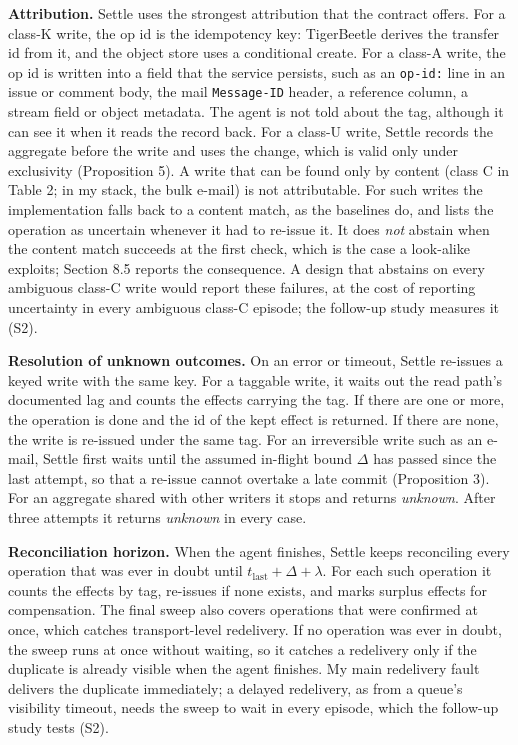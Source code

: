 \documentclass[
  10pt,
]{article}
\begin{document}
\textbf{Attribution.} Settle uses the strongest attribution that the
contract offers. For a class-K write, the op id is the idempotency key:
TigerBeetle derives the transfer id from it, and the object store uses a
conditional create. For a class-A write, the op id is written into a
field that the service persists, such as an \texttt{op-id:} line in an
issue or comment body, the mail \texttt{Message-ID} header, a reference
column, a stream field or object metadata. The agent is not told about
the tag, although it can see it when it reads the record back. For a
class-U write, Settle records the aggregate before the write and uses
the change, which is valid only under exclusivity (Proposition 5). A
write that can be found only by content (class C in Table 2; in my
stack, the bulk e-mail) is not attributable. For such writes the
implementation falls back to a content match, as the baselines do, and
lists the operation as uncertain whenever it had to re-issue it. It does
\emph{not} abstain when the content match succeeds at the first check,
which is the case a look-alike exploits; Section 8.5 reports the
consequence. A design that abstains on every ambiguous class-C write
would report these failures, at the cost of reporting uncertainty in
every ambiguous class-C episode; the follow-up study measures it (S2).

\textbf{Resolution of unknown outcomes.} On an error or timeout, Settle
re-issues a keyed write with the same key. For a taggable write, it
waits out the read path's documented lag and counts the effects carrying
the tag. If there are one or more, the operation is done and the id of
the kept effect is returned. If there are none, the write is re-issued
under the same tag. For an irreversible write such as an e-mail, Settle
first waits until the assumed in-flight bound \(\Delta\) has passed
since the last attempt, so that a re-issue cannot overtake a late commit
(Proposition 3). For an aggregate shared with other writers it stops and
returns \emph{unknown}. After three attempts it returns \emph{unknown}
in every case.

\textbf{Reconciliation horizon.} When the agent finishes, Settle keeps
reconciling every operation that was ever in doubt until
\(t_{\text{last}} + \Delta + \lambda\). For each such operation it
counts the effects by tag, re-issues if none exists, and marks surplus
effects for compensation. The final sweep also covers operations that
were confirmed at once, which catches transport-level redelivery. If no
operation was ever in doubt, the sweep runs at once without waiting, so
it catches a redelivery only if the duplicate is already visible when
the agent finishes. My main redelivery fault delivers the duplicate
immediately; a delayed redelivery, as from a queue's visibility timeout,
needs the sweep to wait in every episode, which the follow-up study
tests (S2).
\end{document}
